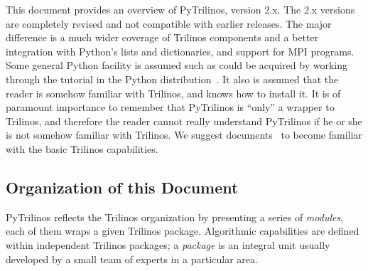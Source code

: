 \documentclass[10pt,relax]{SANDreport}
\newcommand{\PyTrilinos}{{PyTrilinos}}
\begin{document}
This document provides an overview of \PyTrilinos, version 2.x.  The 2.x
versions are completely revised and not compatible with earlier releases. The
major difference is a much wider coverage of Trilinos components and a better
integration with Python's lists and dictionaries, and support for MPI
programs. Some general Python facility is assumed such as could be acquired by
working through the tutorial in the Python
distribution~\cite{python-tutorial}.  It also is assumed that the reader is
somehow familiar with Trilinos, and knows how to install it.  It is of
paramount importance to remember that PyTrilinos is ``only'' a wrapper to
Trilinos, and therefore the reader cannot really understand PyTrilinos if he
or she is not somehow familiar with Trilinos.  We suggest
documents~\cite{Trilinos-tutorial, Trilinos-Users-Guide, Trilinos-home-page} 
to become familiar with the basic Trilinos
capabilities.

\subsection{Organization of this Document}

PyTrilinos reflects the Trilinos organization by presenting a series of {\sl
modules}, each of them wraps a given Trilinos package.  Algorithmic
capabilities are defined within independent Trilinos packages; a {\sl
package} is an integral unit usually developed by a small team of experts
in a particular area. 
\end{document}
